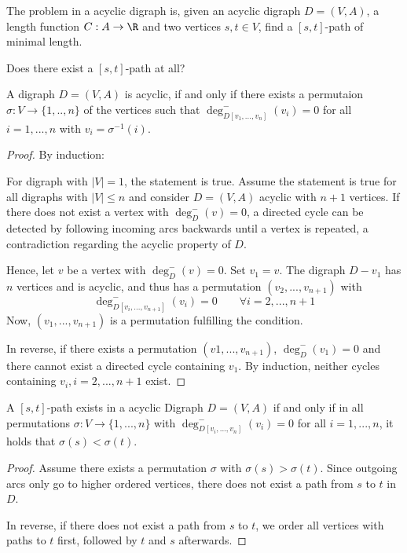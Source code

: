 
\begin{defn}
	The  problem in a acyclic digraph is, given an acyclic digraph $D=(V,A)$, a length function $C: A\rightarrow \R$ and two vertices $s,t\in V$, find a $[s,t]$-path of minimal length.
\end{defn}

\begin{qstn}
Does there exist a $[s,t]$-path at all?
\end{qstn}
\begin{thm}
A digraph $D = (V, A)$ is acyclic, if and only if there exists a permutaion $\sigma : V \rightarrow \{ 1, .., n \}$ of the vertices such that $\deg^-_{D [v_1, ...,  v_n]} (v_i) = 0$ for all $i = 1, ..., n$ with $v_i = \sigma^{-1}(i)$.
\end{thm}
\begin{proof}
By induction:

For digraph with $| V |=1$, the statement is true. Assume the statement is true for all digraphs with $|V| \leq n$ and consider $D = (V, A)$ acyclic with $n+1$ vertices. 
If there does not exist a vertex with $\deg_D^-(v) = 0$, a directed cycle can be detected by following incoming arcs backwards until a vertex is repeated, a contradiction regarding the acyclic property of $D$.

Hence, let $v$ be a vertex with $\deg^-_D(v)=0$. Set $v_1 = v$. The digraph $D - v_1$ has $n$ vertices and is acyclic, and thus has a permutation $(v_2, ..., v_{n+1})$ with
\[ \deg^-_{D[v_i, ..., v_{n+1}]}(v_i) = 0 \qquad \forall i = 2, ..., n+1 \]
Now, $(v_1, ..., v_{n+1})$ is a permutation fulfilling the condition.

In reverse, if there exists a permutation $(v1, ..., v_{n+1})$, $\deg^-_D(v_1) = 0$ and there cannot exist a directed cycle containing $v_1$. By induction, neither cycles containing $v_i, i = 2, ..., n+1$ exist.
\end{proof}

\begin{thm}
A $[s,t]$-path exists in a acyclic Digraph $D = (V, A)$ if and only if in all permutations $\sigma: V \rightarrow \{ 1, ..., n\}$ with $\deg^-_{D[v_i, ..., v_n]}(v_i) = 0$ for all $i = 1, ..., n$, it holds that $\sigma(s) < \sigma(t)$.
\end{thm}
\begin{proof}
Assume there exists a permutation $\sigma$ with $\sigma(s) > \sigma(t)$. Since outgoing arcs only go to higher ordered vertices, there does not exist a path from $s$ to $t$ in $D$.

In reverse, if there does not exist a path from $s$ to $t$, we order all vertices with paths to $t$ first, followed by $t$ and $s$ afterwards. 
\end{proof}

